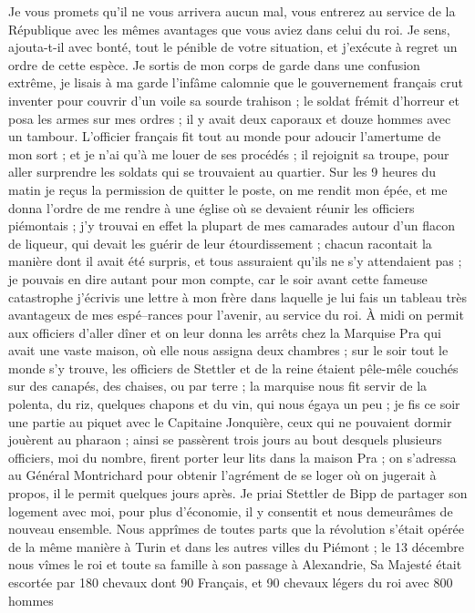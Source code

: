 \documentclass[12pt]{article}
\begin{document}
 Je vous promets qu’il ne vous arrivera aucun mal, vous
entrerez au service de la République avec les mêmes avantages que vous aviez dans celui du roi. Je
sens, ajouta-t-il avec bonté, tout le pénible de votre situation, et j’exécute à regret un ordre de
cette espèce. Je sortis de mon corps de garde dans une confusion extrême, je lisais à ma garde
l’infâme calomnie que le gouvernement français crut inventer pour couvrir d’un voile sa sourde
trahison ; le soldat frémit d’horreur et posa les armes sur mes ordres ; il y avait deux caporaux et
douze hommes avec un tambour. L’officier français fit tout au monde pour adoucir l’amertume de mon
sort ; et je n’ai qu’à me louer de ses procédés ; il rejoignit sa troupe, pour aller surprendre les
soldats qui se trouvaient au quartier. Sur les 9 heures du matin je reçus la permission de quitter
le poste, on me rendit mon épée, et me donna l’ordre de me rendre à une église où se devaient réunir
les officiers piémontais ; j’y trouvai en effet la plupart de mes camarades autour d’un flacon de
liqueur, qui devait les guérir de leur étourdissement ; chacun racontait la manière dont il avait
été surpris, et tous assuraient qu’ils ne s’y attendaient pas ; je pouvais en dire autant pour mon
compte, car le soir avant cette fameuse catastrophe j’écrivis une lettre à mon frère dans laquelle
je lui fais un tableau très avantageux de mes espé–rances pour l’avenir, au service du roi. À midi
on permit aux officiers d’aller dîner et on leur donna les arrêts chez la Marquise Pra qui avait une
vaste maison, où elle nous assigna deux chambres ; sur le soir tout le monde s’y trouve, les
officiers de Stettler et de la reine étaient pêle-mêle couchés sur des canapés, des chaises, ou par
terre ; la marquise nous fit servir de la polenta, du riz, quelques chapons et du vin, qui nous
égaya un peu ; je fis ce soir une partie au piquet avec le Capitaine Jonquière, ceux qui ne
pouvaient dormir jouèrent au pharaon ; ainsi se passèrent trois jours au bout desquels plusieurs
officiers, moi du nombre, firent porter leur lits dans la maison Pra ; on s’adressa au Général
Montrichard pour obtenir l’agrément de se loger où on jugerait à propos, il le permit quelques jours
après. Je priai Stettler de Bipp de partager son logement avec moi, pour plus d’économie, il y
consentit et nous demeurâmes de nouveau ensemble. Nous apprîmes de toutes parts que la révolution
s’était opérée de la même manière à Turin et dans les autres villes du Piémont ; le 13 décembre nous
vîmes le roi et toute sa famille à son passage à Alexandrie, Sa Majesté était escortée par 180
chevaux dont 90 Français, et 90 chevaux légers du roi avec 800 hommes
\end{document}
